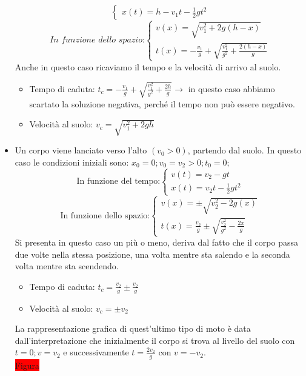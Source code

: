 \documentclass[a4paper,12pt]{report}
\begin{document}
\begin{itemize}
\begin{equation}
\begin{cases}
				x(t) = h - v_1t - \frac{1}{2}gt^2
			\end{cases}
		\end{equation}
		\begin{equation}
			\textit{In funzione dello spazio:}
			\begin{cases}
				v(x) = \sqrt{v_1^2 + 2g(h-x)}\\
				t(x) = -\frac{v_1}{g} + \sqrt{\frac{v_1^2}{g^2} + \frac{2(h-x)}{g}}
			\end{cases}
		\end{equation}
		Anche in questo caso ricaviamo il tempo e la velocità di arrivo al suolo.
		\begin{itemize}
			\item Tempo di caduta: $t_c = -\frac{v_1}{g} + \sqrt{\frac{v_1^2}{g^2} + \frac{2h}{g}}\rightarrow$ in questo caso abbiamo scartato la soluzione negativa, perché il tempo non può essere negativo.
			\item Velocità al suolo: $v_c = \sqrt{v_1^2 + 2gh}$
		\end{itemize}
		\item Un corpo viene lanciato verso l'alto $(v_0 > 0)$, partendo dal suolo. In questo caso le condizioni iniziali sono: $x_0 = 0;$\;\;\;$v_0 = v_2 > 0;$\;\;\;$t_0 = 0;$
		\begin{equation}
			\text{In funzione del tempo:}
			\begin{cases}
				v(t) = v_2 - gt\\
				x(t) = v_2t - \frac{1}{2}gt^2
			\end{cases}
		\end{equation}
		\begin{equation}
			\text{In funzione dello spazio:}
			\begin{cases}
				v(x) = \pm\sqrt{v_2^2 - 2g(x)}\\
				t(x) = \frac{v_2}{g}\pm\sqrt{\frac{v_2^2}{g^2} - \frac{2x}{g}}
			\end{cases}
		\end{equation}
		Si presenta in questo caso un più o meno, deriva dal fatto che il corpo passa due volte nella stessa posizione, una volta mentre sta salendo e la seconda volta mentre sta scendendo.
		\begin{itemize}
			\item Tempo di caduta: $t_c = \frac{v_2}{g}\pm\frac{v_2}{g}$
			\item Velocità al suolo: $v_c = \pm v_2$
		\end{itemize}
		La rappresentazione grafica di quest'ultimo tipo di moto è data dall'interpretazione che inizialmente il corpo si trova al livello del suolo con $t = 0;$\;\;\;$v = v_2$ e successivamente $t = \frac{2v_2}{g}$ con $v = -v_2$.\\
		\colorbox{red}{Figura}
	\end{itemize}
	
\end{document}
